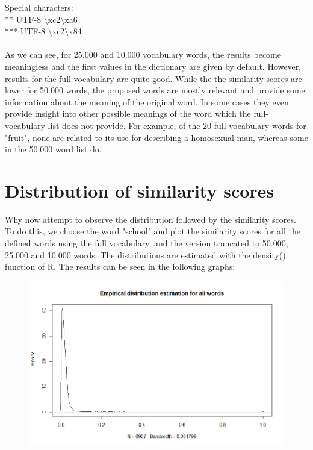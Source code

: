 \documentclass[10pt, a4paper, oneside]{article} %
\begin{document}
Special characters: \\
** UTF-8 $\setminus$xc2$\setminus$xa6 \\ 
*** UTF-8 $\setminus$xc2$\setminus$x84

\paragraph*{}
As we can see, for 25.000 and 10.000 vocabulary words, the results become meaningless and the first values in the dictionary are given by default. However, results for the full vocabulary are quite good. While the the similarity scores are lower for 50.000 words, the proposed words are mostly relevant and provide some information about the meaning of the original word. In some cases they even provide insight into other possible meanings of the word which the full-vocabulary list does not provide. For example, of the 20 full-vocabulary words for "fruit", none are related to its use for describing a homosexual man, whereas some in the 50.000 word list do.

\section{Distribution of similarity scores}
Why now attempt to observe the distribution followed by the similarity scores. To do this, we choose the word "school" and plot the similarity scores for all the defined words using the full vocabulary, and the version truncated to 50.000, 25.000 and 10.000 words. The distributions are estimated with the density() function of R. The results can be seen in the following graphs:

\begin{figure}[! ht]
\centering
\includegraphics[scale=0.5]{./Figures/all.png}
\label{all}
\end{figure}
\end{document}
